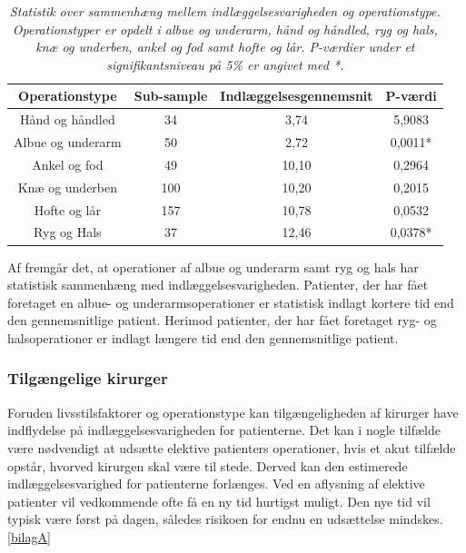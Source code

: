 \begin{table}[H]
\centering
\begin{tabular}{|c|c|c|c|}
\hline
\textbf{Operationstype} & \textbf{Sub-sample} & \textbf{Indlæggelsesgennemsnit} & \textbf{P-værdi} \\ \hline
Hånd og håndled   & 34                  & 3,74                            & 5,9083           \\ \hline
Albue og underarm & 50                  & 2,72                            & 0,0011*          \\ \hline
Ankel og fod      & 49                  & 10,10                           & 0,2964           \\ \hline
Knæ og underben   & 100                 & 10,20                           & 0,2015           \\ \hline
Hofte og lår      & 157                 & 10,78                           & 0,0532 \\ \hline
Ryg og Hals       & 37                  & 12,46                           & 0,0378*          \\ \hline
\end{tabular}
\caption{\textit{Statistik over sammenhæng mellem indlæggelsesvarigheden og operationstype. Operationstyper er opdelt i albue og underarm, hånd og håndled, ryg og hals, knæ og underben, ankel og fod samt hofte og lår. P-værdier under et signifikantsniveau på 5\% er angivet med *.}}
\label{optypeogindlaegtab}
\end{table}

\noindent
Af  fremgår det, at  operationer af albue og underarm samt ryg og hals har statistisk sammenhæng med indlæggelsesvarigheden. Patienter, der har fået foretaget en albue- og underarmsoperationer er statistisk indlagt kortere tid end den gennemsnitlige patient. Herimod patienter, der har fået foretaget  ryg- og halsoperationer er indlagt længere tid end den gennemsnitlige patient.


\subsubsection{Tilgængelige kirurger}
Foruden livsstilsfaktorer og operationstype kan tilgængeligheden af kirurger have indflydelse på indlæggelsesvarigheden for patienterne. Det kan i nogle tilfælde være nødvendigt at udsætte elektive patienters operationer, hvis et akut tilfælde opstår, hvorved kirurgen skal være til stede. Derved kan den estimerede indlæggelsesvarighed for patienterne forlænges. Ved en aflysning af elektive patienter vil vedkommende ofte få en ny tid hurtigst muligt. Den nye tid vil typisk være først på dagen, således risikoen for endnu en udsættelse mindskes.\ref{bilagA}